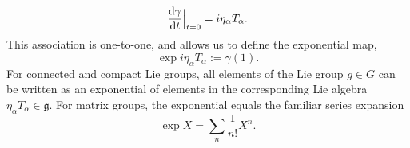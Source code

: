 \begin{equation}
    \odv{\gamma}{t} \Big|_{t=0} = i \eta_\alpha T_\alpha.
\end{equation}
%
This association is one-to-one, and allows us to define the exponential map,
\begin{equation}
    \exp{i \eta_\alpha T_\alpha} := \gamma(1).
\end{equation}
%
For connected and compact Lie groups, all elements of the Lie group $g \in G$ can be written as an exponential of elements in the corresponding Lie algebra $\eta_\alpha T_\alpha \in \mathfrak g$.
For matrix groups, the exponential equals the familiar series expansion
%
\begin{equation}
    \exp{X} = \sum_n \frac{1}{n!} X^n.
\end{equation}
%
